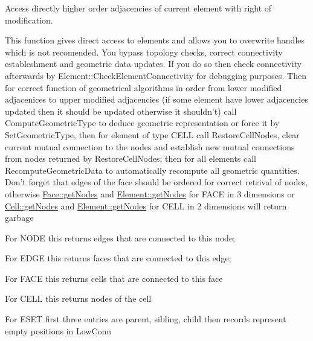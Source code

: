 Access directly higher order adjacencies of current element with right of modification. 

This function gives direct access to elements and allows you to overwrite handles which is not recomended. You bypass topology checks, correct connectivity estableshment and geometric data updates. If you do so then check connectivity afterwards by Element\-::\-Check\-Element\-Connectivity for debugging purposes. Then for correct function of geometrical algorithms in order from lower modified adjacenices to upper modified adjacencies (if some element have lower adjacencies updated then it should be updated otherwise it shouldn't) call Compute\-Geometric\-Type to deduce geometric representation or force it by Set\-Geometric\-Type, then for element of type C\-E\-L\-L call Restore\-Cell\-Nodes, clear current mutual connection to the nodes and establish new mutual connections from nodes returned by Restore\-Cell\-Nodes; then for all elements call Recompute\-Geometric\-Data to automatically recompute all geometric quantities. Don't forget that edges of the face should be ordered for correct retrival of nodes, otherwise \hyperlink{classINMOST_1_1Face_a102ef5504795e2b3607093071259397e}{Face\-::get\-Nodes} and \hyperlink{classINMOST_1_1Element_a00696ff8cd77491e1c4307cae166e92d}{Element\-::get\-Nodes} for F\-A\-C\-E in 3 dimensions or \hyperlink{classINMOST_1_1Cell_acc265095375df199a083a344d56e4645}{Cell\-::get\-Nodes} and \hyperlink{classINMOST_1_1Element_a00696ff8cd77491e1c4307cae166e92d}{Element\-::get\-Nodes} for C\-E\-L\-L in 2 dimensions will return garbage


\begin{DoxyItemize}
\item For N\-O\-D\-E this returns edges that are connected to this node;
\item For E\-D\-G\-E this returns faces that are connected to this edge;
\item For F\-A\-C\-E this returns cells that are connected to this face
\item For C\-E\-L\-L this returns nodes of the cell
\item For E\-S\-E\-T first three entries are parent, sibling, child then records represent empty positions in Low\-Conn
\end{DoxyItemize}


